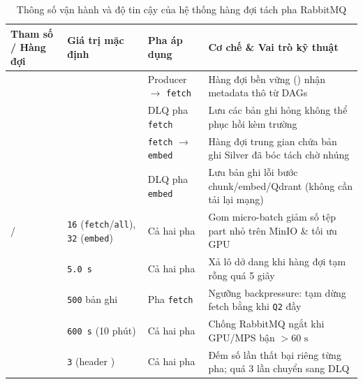\begin{table}[htbp]
  \centering
  \small
  \caption[Thông số vận hành và độ tin cậy hàng đợi RabbitMQ hai pha]{Thông số vận hành và độ tin cậy của hệ thống hàng đợi tách pha RabbitMQ}
  \label{tab:ch2_rabbitmq_config}
  \setlength{\tabcolsep}{3.5pt}
  \begin{tabularx}{\linewidth}{|>{\raggedright\arraybackslash}p{37mm}|>{\raggedright\arraybackslash}p{35mm}|>{\centering\arraybackslash}p{20mm}|L|}
    \hline
    \textbf{Tham số / Hàng đợi} & \textbf{Giá trị mặc định} & \textbf{Pha áp dụng} & \textbf{Cơ chế \& Vai trò kỹ thuật} \\
    \hline
     &  & Producer $\rightarrow$ \texttt{fetch} & Hàng đợi bền vững () nhận metadata thô từ DAGs \\
    \hline
     &  & DLQ pha \texttt{fetch} & Lưu các bản ghi hỏng không thể phục hồi kèm trường  \\
    \hline
     &  & \texttt{fetch} $\rightarrow$ \texttt{embed} & Hàng đợi trung gian chứa bản ghi Silver đã bóc tách chờ nhúng \\
    \hline
     &  & DLQ pha \texttt{embed} & Lưu bản ghi lỗi bước chunk/embed/Qdrant (không cần tải lại mạng) \\
    \hline
     /  & \texttt{16} (\texttt{fetch}/\texttt{all}), \texttt{32} (\texttt{embed}) & Cả hai pha & Gom micro-batch giảm số tệp part nhỏ trên MinIO \& tối ưu GPU \\
    \hline
     & \texttt{5.0 s} & Cả hai pha & Xả lô dở dang khi hàng đợi tạm rỗng quá 5 giây \\
    \hline
     & \texttt{500} bản ghi & Pha \texttt{fetch} & Ngưỡng backpressure: tạm dừng fetch bằng  khi \texttt{Q2} đầy \\
    \hline
     & \texttt{600 s} (10 phút) & Cả hai pha & Chống RabbitMQ ngắt  khi GPU/MPS bận $>60\text{ s}$ \\
    \hline
     & \texttt{3} (header ) & Cả hai pha & Đếm số lần thất bại riêng từng pha; quá 3 lần chuyển sang DLQ \\
    \hline
  \end{tabularx}
\end{table}

